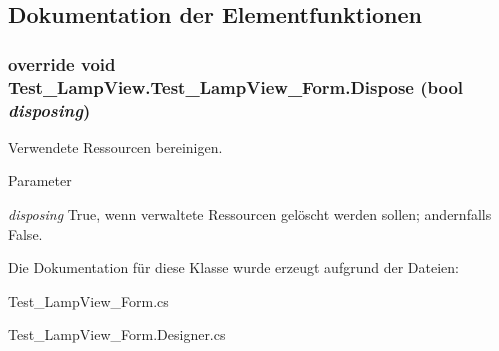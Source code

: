 \subsection{Dokumentation der Elementfunktionen}
\hypertarget{class_test___lamp_view_1_1_test___lamp_view___form_a867822dded05866aed7e0345c4d45033}{
\subsubsection[{Dispose}]{\setlength{\rightskip}{0pt plus 5cm}override void Test\_\-LampView.Test\_\-LampView\_\-Form.Dispose (bool {\em disposing})}}
\label{class_test___lamp_view_1_1_test___lamp_view___form_a867822dded05866aed7e0345c4d45033}


Verwendete Ressourcen bereinigen. 


\begin{DoxyParams}{Parameter}
\item[{\em disposing}]True, wenn verwaltete Ressourcen gelöscht werden sollen; andernfalls False.\end{DoxyParams}


Die Dokumentation für diese Klasse wurde erzeugt aufgrund der Dateien:\begin{DoxyCompactItemize}
\item 
Test\_\-LampView\_\-Form.cs\item 
Test\_\-LampView\_\-Form.Designer.cs\end{DoxyCompactItemize}
